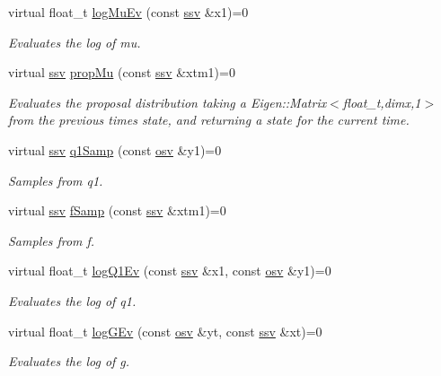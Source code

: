 \begin{DoxyCompactItemize}
virtual float\+\_\+t \hyperlink{classAPF_a5aec51329be45a220697573bedb2f547}{log\+Mu\+Ev} (const \hyperlink{classAPF_a8b170471292cd6fb5c3c19b55b42fc4e}{ssv} \&x1)=0
\begin{DoxyCompactList}\small\item\em Evaluates the log of mu. \end{DoxyCompactList}\item 
virtual \hyperlink{classAPF_a8b170471292cd6fb5c3c19b55b42fc4e}{ssv} \hyperlink{classAPF_aac5dbff4d903db9952dbf01e7aa25d44}{prop\+Mu} (const \hyperlink{classAPF_a8b170471292cd6fb5c3c19b55b42fc4e}{ssv} \&xtm1)=0
\begin{DoxyCompactList}\small\item\em Evaluates the proposal distribution taking a Eigen\+::\+Matrix$<$float\+\_\+t,dimx,1$>$ from the previous time\textquotesingle{}s state, and returning a state for the current time. \end{DoxyCompactList}\item 
virtual \hyperlink{classAPF_a8b170471292cd6fb5c3c19b55b42fc4e}{ssv} \hyperlink{classAPF_ab50c4cc94c46502910c133d0ff0397f6}{q1\+Samp} (const \hyperlink{classAPF_ae4887b3f7121a7509397dd00bffedfe0}{osv} \&y1)=0
\begin{DoxyCompactList}\small\item\em Samples from q1. \end{DoxyCompactList}\item 
virtual \hyperlink{classAPF_a8b170471292cd6fb5c3c19b55b42fc4e}{ssv} \hyperlink{classAPF_a795a0d1a16de1004a6308b317d125340}{f\+Samp} (const \hyperlink{classAPF_a8b170471292cd6fb5c3c19b55b42fc4e}{ssv} \&xtm1)=0
\begin{DoxyCompactList}\small\item\em Samples from f. \end{DoxyCompactList}\item 
virtual float\+\_\+t \hyperlink{classAPF_a87628cc243a8d0244303ccf50e18d90e}{log\+Q1\+Ev} (const \hyperlink{classAPF_a8b170471292cd6fb5c3c19b55b42fc4e}{ssv} \&x1, const \hyperlink{classAPF_ae4887b3f7121a7509397dd00bffedfe0}{osv} \&y1)=0
\begin{DoxyCompactList}\small\item\em Evaluates the log of q1. \end{DoxyCompactList}\item 
virtual float\+\_\+t \hyperlink{classAPF_ae59982358f7fd88203e2fcb86874d64b}{log\+G\+Ev} (const \hyperlink{classAPF_ae4887b3f7121a7509397dd00bffedfe0}{osv} \&yt, const \hyperlink{classAPF_a8b170471292cd6fb5c3c19b55b42fc4e}{ssv} \&xt)=0
\begin{DoxyCompactList}\small\item\em Evaluates the log of g. \end{DoxyCompactList}\end{DoxyCompactItemize}
